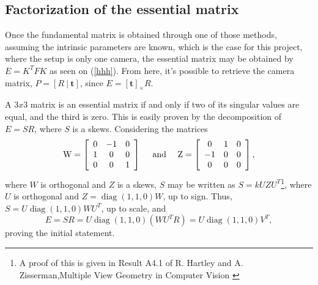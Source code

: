 \subsection{Factorization of the essential matrix}

Once the fundamental matrix is obtained through one of those methods, assuming the intrinsic parameters are known, which is the case for this project, where the setup is only one camera, the essential matrix may be obtained by $E = K^{T}  F K$ as seen on (\ref{hhh}).
From here, it's possible to retrieve the camera matrix, $P = [R \ | \ \mathbf{t}]$, since $E = [\mathbf{t}]_\times R$. 

A $3x3$ matrix is an essential matrix if and only if two of its singular values are equal, and the third is zero. This is easily proven by the decomposition of $E = SR$, where $S$ is a \gls{skews}.
Considering the matrices 
\begin{equation}
\mathrm { W } = \left[ \begin{array} { c c c } { 0 } & { - 1 } & { 0 } \\ { 1 } & { 0 } & { 0 } \\ { 0 } & { 0 } & { 1 } \end{array} \right] \quad \text { and } \quad \mathrm { Z } = \left[ \begin{array} { c c c } { 0 } & { 1 } & { 0 } \\ { - 1 } & { 0 } & { 0 } \\ { 0 } & { 0 } & { 0 } \end{array} \right],
\end{equation}
where $W$ is orthogonal and $Z$ is a \gls{skews}, $S$ may be written as $S = kUZU^T$\footnote{A proof of this is given in Result A4.1 of R. Hartley and A. Zisserman,Multiple View Geometry in Computer Vision \cite{multiview}}, where $U$ is orthogonal and $Z = \operatorname{diag}(1,1,0)W$, up to sign. Thus, $S = U \operatorname { diag } ( 1,1,0 ) WU^T$, up to scale, and 
\begin{equation}
E = SR = U \operatorname { diag } ( 1,1,0 ) \left( WU^T R \right) = U \operatorname { diag } ( 1,1,0 ) V^T,
\end{equation}
proving the initial statement.

